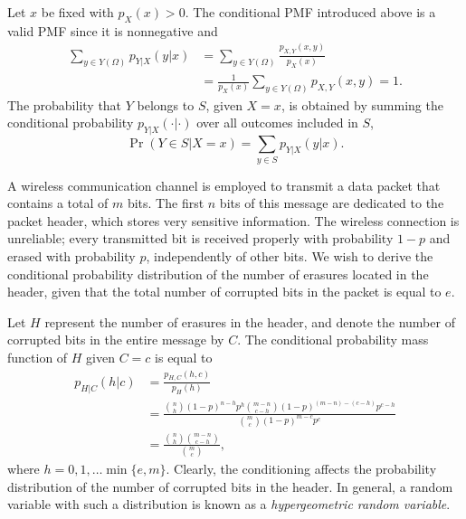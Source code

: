 Let $x$ be fixed with $p_X (x) > 0$.
The conditional PMF introduced above is a valid PMF since it is nonnegative and
\begin{equation*}
\begin{split}
\sum_{y \in Y(\Omega)} p_{Y|X} (y|x)
&= \sum_{y \in Y(\Omega)} \frac{p_{X,Y} (x,y)}{p_X (x)} \\
&= \frac{1}{p_X (x)} \sum_{y \in Y(\Omega)} p_{X,Y} (x,y) = 1.
\end{split}
\end{equation*}
The probability that $Y$ belongs to $S$, given $X = x$, is obtained by summing the conditional probability $p_{Y|X} (\cdot | \cdot)$ over all outcomes included in $S$,
\begin{equation*}
\Pr (Y \in S | X = x) = \sum_{y \in S} p_{Y|X} (y | x) .
\end{equation*}

\begin{example}
A wireless communication channel is employed to transmit a data packet that contains a total of $m$ bits.
The first $n$ bits of this message are dedicated to the packet header, which stores very sensitive information.
The wireless connection is unreliable; every transmitted bit is received properly with probability $1-p$ and erased with probability $p$, independently of other bits.
We wish to derive the conditional probability distribution of the number of erasures located in the header, given that the total number of corrupted bits in the packet is equal to $e$.

Let $H$ represent the number of erasures in the header, and denote the number of corrupted bits in the entire message by $C$.
The conditional probability mass function of $H$ given $C = c$ is equal to
\begin{equation*}
\begin{split}
p_{H|C} (h|c) &= \frac{p_{H,C} (h,c)}{p_H (h)} \\
&= \frac{\binom{n}{h} (1-p)^{n-h} p^h
\binom{m-n}{c-h} (1-p)^{(m-n)-(c-h)} p^{c - h}}{\binom{m}{c} (1-p)^{m-c} p^c} \\
&= \frac{\binom{n}{h} \binom{m-n}{c-h}}{\binom{m}{c}} ,
\end{split}
\end{equation*}
where $h = 0, 1, \ldots \min \{ e, m \}$.
Clearly, the conditioning affects the probability distribution of the number of corrupted bits in the header.
In general, a random variable with such a distribution is known as a \emph{hypergeometric random variable}. 
\end{example}

